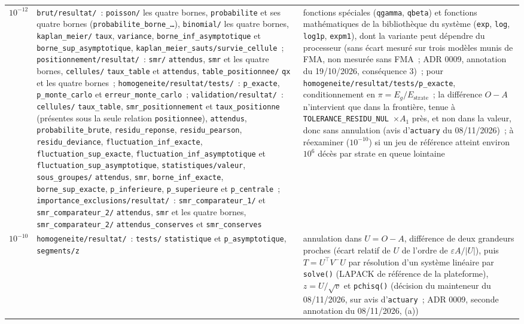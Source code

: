 \documentclass[a4paper,11pt]{article}
\newcommand{\code}[1]{\texttt{\small #1}}
\begin{document}
{\begin{longtable}{@{}p{1.4cm}>{\raggedright\arraybackslash}p{9.4cm}p{3.8cm}@{}}
$10^{-12}$ & \code{brut/resultat/}~: \code{poisson/} les quatre bornes, \code{probabilite} et ses quatre bornes (\code{probabilite\_borne\_\ldots}), \code{binomial/} les quatre bornes, \code{kaplan\_meier/} \code{taux}, \code{variance}, \code{borne\_inf\_asymptotique} et \code{borne\_sup\_asymptotique}, \code{kaplan\_meier\_sauts/survie\_cellule}~; \code{positionnement/resultat/}~: \code{smr/} \code{attendus}, \code{smr} et les quatre bornes, \code{cellules/} \code{taux\_table} et \code{attendus}, \code{table\_positionnee/} \code{qx} et les quatre bornes~; \code{homogeneite/resultat/tests/}~: \code{p\_exacte}, \code{p\_monte\_carlo} et \code{erreur\_monte\_carlo}~; \code{validation/resultat/}~: \code{cellules/} \code{taux\_table}, \code{smr\_positionnement} et \code{taux\_positionne} (présentes sous la seule relation \code{positionnee}), \code{attendus}, \code{probabilite\_brute}, \code{residu\_reponse}, \code{residu\_pearson}, \code{residu\_deviance}, \code{fluctuation\_inf\_exacte}, \code{fluctuation\_sup\_exacte}, \code{fluctuation\_inf\_asymptotique} et \code{fluctuation\_sup\_asymptotique}, \code{statistiques/valeur}, \code{sous\_groupes/} \code{attendus}, \code{smr}, \code{borne\_inf\_exacte}, \code{borne\_sup\_exacte}, \code{p\_inferieure}, \code{p\_superieure} et \code{p\_centrale}~; \code{importance\_exclusions/resultat/}~: \code{smr\_comparateur\_1/} et \code{smr\_comparateur\_2/} \code{attendus}, \code{smr} et les quatre bornes, \code{smr\_comparateur\_2/} \code{attendus\_conserves} et \code{smr\_conserves} & fonctions spéciales (\code{qgamma}, \code{qbeta}) et fonctions mathématiques de la bibliothèque du système (\code{exp}, \code{log}, \code{log1p}, \code{expm1}), dont la variante peut dépendre du processeur (sans écart mesuré sur trois modèles munis de FMA, non mesurée sans FMA~; ADR 0009, annotation du 19/10/2026, conséquence 3)~; pour \code{homogeneite/}\allowbreak\code{resultat/}\allowbreak\code{tests/}\allowbreak\code{p\_exacte}, conditionnement en $\pi = E_g / E_{\text{strate}}$~; la différence $O - A$ n'intervient que dans la frontière, tenue à \code{TOLERANCE\_}\allowbreak\code{RESIDU\_NUL}~$\times A_1$ près, et non dans la valeur, donc sans annulation (avis d'\code{actuary} du 08/11/2026)~; à réexaminer ($10^{-10}$) si un jeu de référence atteint environ $10^6$ décès par strate en queue lointaine \\
$10^{-10}$ & \code{homogeneite/resultat/}~: \code{tests/} \code{statistique} et \code{p\_asymptotique}, \code{segments/z} & annulation dans $U = O - A$, différence de deux grandeurs proches (écart relatif de $U$ de l'ordre de $\varepsilon A / |U|$), puis $T = U^{\top}V^{-}U$ par résolution d'un système linéaire par \code{solve()} (LAPACK de référence de la plateforme), $z = U/\sqrt{v}$ et \code{pchisq()} (décision du mainteneur du 08/11/2026, sur avis d'\code{actuary}~; ADR 0009, seconde annotation du 08/11/2026, (a)) \\
\end{longtable}
}
\end{document}
